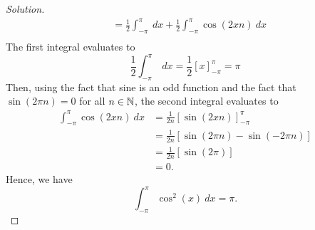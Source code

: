 \begin{enumerate}
\begin{proof}[Solution]
\begin{align*}
                                                          &= \frac{ 1 }{ 2 } \int_{ - \pi  }^{ \pi  }  \ dx + \frac{ 1 }{ 2 }  \int_{ - \pi  }^{ \pi  } \cos(2xn) \ dx \\
            \end{align*}
            The first integral evaluates to 
            \[  \frac{ 1 }{ 2 } \int_{ - \pi  }^{ \pi  }  \ dx = \frac{ 1 }{ 2 }  [ x]_{- \pi}^{\pi } = \pi  \]
            Then, using the fact that sine is an odd function and the fact that \( \sin(2 \pi n ) = 0  \) for all \( n \in \mathbb{N}  \), the second integral evaluates to
            \begin{align*}
                \int_{ - \pi  }^{ \pi  } \cos(2xn) \ dx &= \frac{ 1 }{ 2n } [ \sin(2x n)]_{- \pi}^{\pi } \\
                                                       &= \frac{ 1 }{ 2n } [ \sin( 2\pi n) - \sin(- 2 \pi n)] \\
                                                       &= \frac{ 1 }{ 2n } [ \sin(2 \pi)] \tag{ \( \sin(-2 \pi n) = -\sin(2 \pi n) \)} \\
                                                       &= 0.
            \end{align*}
            Hence, we have 
            \[  \int_{ - \pi  }^{ \pi  } \cos^{2}(x) \ dx = \pi. \]


\end{proof}
\end{enumerate}
